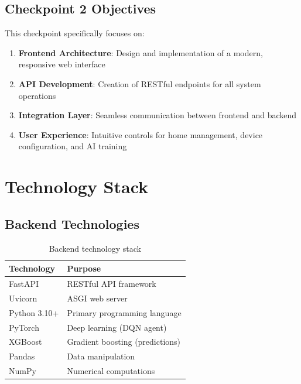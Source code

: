 \documentclass[12pt,a4paper]{article}
\begin{document}
\subsection{Checkpoint 2 Objectives}

This checkpoint specifically focuses on:
\begin{enumerate}[leftmargin=*]
    \item \textbf{Frontend Architecture}: Design and implementation of a modern, responsive web interface
    \item \textbf{API Development}: Creation of RESTful endpoints for all system operations
    \item \textbf{Integration Layer}: Seamless communication between frontend and backend
    \item \textbf{User Experience}: Intuitive controls for home management, device configuration, and AI training
\end{enumerate}

\section{Technology Stack}

\subsection{Backend Technologies}

\begin{table}[H]
\centering
\begin{tabular}{@{}ll@{}}
\toprule
\textbf{Technology} & \textbf{Purpose} \\ \midrule
FastAPI & RESTful API framework \\
Uvicorn & ASGI web server \\
Python 3.10+ & Primary programming language \\
PyTorch & Deep learning (DQN agent) \\
XGBoost & Gradient boosting (predictions) \\
Pandas & Data manipulation \\
NumPy & Numerical computations \\ \bottomrule
\end{tabular}
\caption{Backend technology stack}
\label{tab:backend-stack}
\end{table}
\end{document}
